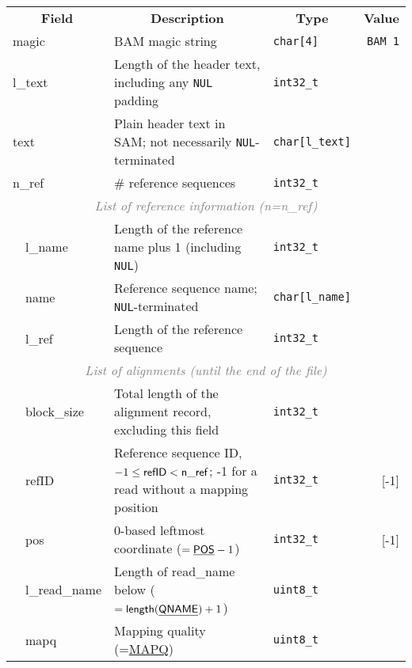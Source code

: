 \documentclass[10pt]{article}
\begin{document}
\begin{table}[ht]
\centering
{\small
\begin{tabular}{|l|l|l|p{8.15cm}|l|r|}
  \cline{1-6}
  \multicolumn{3}{|c|}{\bf Field} & \multicolumn{1}{c|}{\bf Description} & \multicolumn{1}{c|}{\bf Type} & \multicolumn{1}{c|}{\bf Value} \\\cline{1-6}
  \multicolumn{3}{|l|}{\sf magic} & BAM magic string & {\tt char[4]} & {\tt BAM\char92 1}\\\cline{1-6}
  \multicolumn{3}{|l|}{\sf l\_text} & Length of the header text, including any {\tt NUL} padding & {\tt int32\_t} & \\\cline{1-6}
  \multicolumn{3}{|l|}{\sf text} & Plain header text in SAM; not necessarily {\tt NUL}-terminated & {\tt char[{\sf l\_text}]} & \\\cline{1-6}
  \multicolumn{3}{|l|}{\sf n\_ref} & \# reference sequences & {\tt int32\_t} & \\\cline{1-6}
  \multicolumn{6}{|c|}{\textcolor{gray}{\it List of reference information (n=n\_ref)}} \\\cline{2-6}
  & \multicolumn{2}{l|}{\sf l\_name} & Length of the reference name plus 1 (including {\tt NUL}) & {\tt int32\_t} & \\\cline{2-6}
  & \multicolumn{2}{l|}{\sf name} & Reference sequence name; {\tt NUL}-terminated & {\tt char[{\sf l\_name}]} & \\\cline{2-6}
  & \multicolumn{2}{l|}{\sf l\_ref} & Length of the reference sequence & {\tt int32\_t} & \\\cline{1-6}
  \multicolumn{6}{|c|}{\textcolor{gray}{\it List of alignments (until the end of the file)}} \\\cline{2-6}
  & \multicolumn{2}{l|}{\sf block\_size} & Total length of the alignment record, excluding this field & {\tt int32\_t} & \\\cline{2-6}
  & \multicolumn{2}{l|}{\sf refID} & Reference sequence ID, $-1\leq{\sf refID}<{\sf n\_ref}$; -1 for a read without a mapping position & {\tt int32\_t} & [-1] \\\cline{2-6}
  & \multicolumn{2}{l|}{\sf pos} & 0-based leftmost coordinate ($=\underline{\sf POS}-1$)& {\tt int32\_t} & [-1]\\\cline{2-6}
  & \multicolumn{2}{l|}{\sf l\_read\_name} & Length of {\sf read\_name} below ($={\sf length}(\underline{\sf QNAME})+1$) & {\tt uint8\_t} & \\\cline{2-6}
  & \multicolumn{2}{l|}{\sf mapq} & Mapping quality (=\underline{\sf MAPQ}) & {\tt uint8\_t} & \\\cline{2-6}

\end{tabular}}
\end{table}
\end{document}
